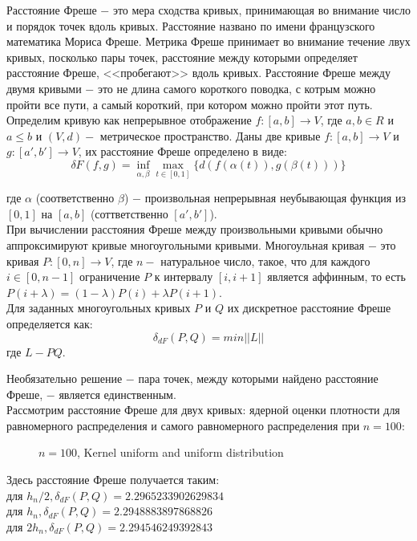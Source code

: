 Расстояние Фреше $-$ это мера сходства кривых, принимающая во внимание число и порядок точек вдоль кривых. Расстояние названо по имени французского математика Мориса Фреше.
Метрика Фреше принимает во внимание течение лвух кривых, посколько пары точек, расстояние между которыми определяет расстояние Фреше, <<пробегают>> вдоль кривых.
Расстояние Фреше между двумя кривыми $-$ это не длина самого короткого поводка, с котрым можно пройти все пути, а самый короткий, при котором можно пройти этот путь. \\

Определим кривую как непрерывное отображение $f: [a,b] \rightarrow V$, где $a, b \in R$ и $a \leq b$ и $(V,d) - $ метрическое пространство.
Даны две кривые $f: [a,b] \rightarrow V$ и $g: [a',b'] \rightarrow V$, их расстояние Фреше определено в виде:
\begin{equation}
    \delta F(f,g) = \inf_{\alpha, \beta}\max_{t \in [0,1]}{\{d(f(\alpha(t)), g(\beta(t)))\}}
\end{equation}

где $\alpha$ (соответственно $\beta$) $-$ произвольная непрерывная неубывающая функция из $[0, 1]$ на $[a, b]$ (соттветственно $[a',b']$). \\
При вычислении расстояния Фреше между произвольными кривыми обычно аппроксимируют кривые многоугольными кривыми. Многоульная кривая $-$ это кривая $P: [0,n] \rightarrow V$, где $n - $ натуральное число, такое, что для каждого $i \in [0,n-1]$ ограничение $P$ к интервалу $[i,i+1]$ является аффинным, то есть $P(i+\lambda) = (1-\lambda)P(i)+\lambda P(i+1)$. \\
Для заданных многоугольных кривых $P$ и $Q$ их дискретное расстояние Фреше определяется как:
\begin{equation}
    \delta_{dF}(P,Q)=min || L ||
\end{equation}
где $L - PQ$.

Необязательно решение $ - $ пара точек, между которыми найдено расстояние Фреше, $-$ является единственным. \\

Рассмотрим расстояние Фреше для двух кривых: ядерной оценки плотности для равномерного распределения и самого равномерного распределения при $n=100$:

\begin{figure}[ht]
	\centering
	\caption{$n = 100$, Kernel uniform and uniform distribution}
	\label{Frechet_dist}
\end{figure}
Здесь расстояние Фреше получается таким:\\
для $h_n/2, \delta_{dF}(P,Q) = 2.2965233902629834$ \\
для $h_n, \delta_{dF}(P,Q) = 2.2948883897868826$ \\
для $2h_n, \delta_{dF}(P,Q) = 2.294546249392843$ \\
